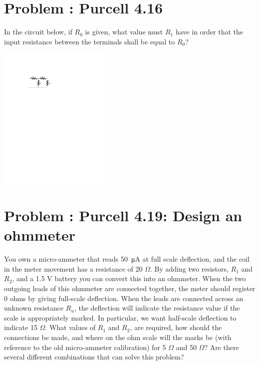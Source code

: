 \documentclass[problems]{esg8022pset}
\begin{document}
\section{Problem \thesection: Purcell 4.16}
  In the circuit below, if $R_0$ is given, what value must $R_1$ have in order
  that the input resistance between the terminals shall be equal to $R_0$?

  \begin{center}\includegraphics[width=0.4\textwidth]{ps06_05_01.pdf}\end{center}
\section{Problem \thesection: Purcell 4.19: Design an ohmmeter}
  You own a micro-ammeter that reads \SI{50}{\micro\ampere} at full scale deflection, and the coil in the meter movement has a resistance of 20 $\Omega$. By adding two resistors, $R_1$ and $R_2$, and a 1.5 V battery you can convert this into an ohmmeter. When the two outgoing leads of this ohmmeter are connected together, the meter should register 0 ohms by giving full-scale deflection. When the leads are connected across an unknown resistance $R_u$, the deflection will indicate the resistance value if the scale is appropriately marked. In particular, we want half-scale deflection to indicate 15 $\Omega$. What values of $R_1$ and $R_2$, are required, how should the connections be made, and where on the ohm scale will the marks be (with reference to the old micro-ammeter calibration) for 5 $\Omega$ and 50 $\Omega$? Are there several different combinations that can solve this problem?
\end{document}
